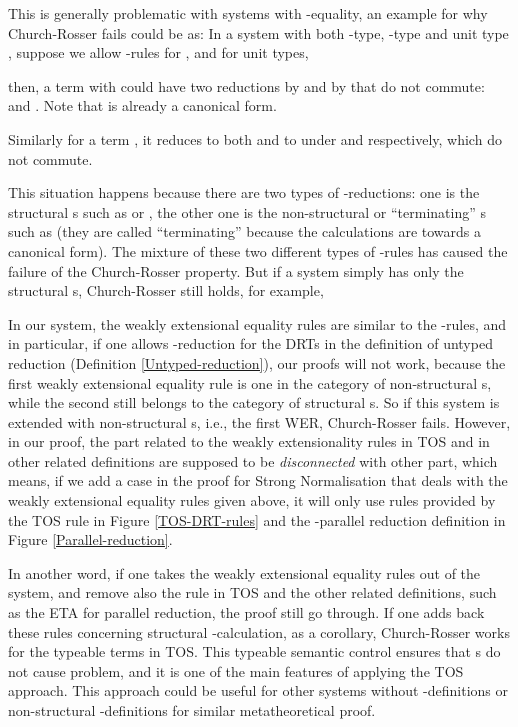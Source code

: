 \documentclass[submission,copyright,creativecommons]{eptcs}
\newcommand{\selfcomment}[1]{\ifodd 0 {\sf #1 }\fi}
\newcommand{\selfc}{\selfcomment}
\begin{document}
\selfc{

\par{
This is generally problematic with systems with -equality, an example for why Church-Rosser fails could be as: In a system with both -type, -type and unit type , suppose we allow -rules for ,  and for unit types, }


then, a term  with  could have two reductions by  and by  that do not commute:  and . Note that  is already a canonical form.
\par{Similarly for a term , it reduces to both  and to } under  and  respectively, which do not commute.

This situation happens because there are two types of -reductions: one is the structural s such as  or , the other one is the non-structural or ``terminating'' s such as  (they are called ``terminating'' because the calculations are towards a canonical form). The mixture of these two different types of -rules has caused the failure of the Church-Rosser property. But if a system simply has only the structural s, Church-Rosser still holds, for example,



\par{In our system, the weakly extensional equality rules are similar to the -rules, and in particular, if one allows -reduction for the DRTs in the definition of untyped reduction (Definition \ref{Untyped-reduction}), our proofs will not work, because the first weakly extensional equality rule is one in the category of non-structural s, while the second still belongs to the category of structural s. So if this system is extended with non-structural s, i.e., the first WER, Church-Rosser fails. However, in our proof, the part related to the weakly extensionality rules in TOS and in other related definitions are supposed to be \emph{disconnected} with other part, which means, if we add a case in the proof for Strong Normalisation that deals with the weakly extensional equality rules given above, it will only use rules provided by the TOS rule  in Figure \ref{TOS-DRT-rules} and the -parallel reduction definition in Figure \ref{Parallel-reduction}. }
\par{In another word, if one takes the weakly extensional equality rules out of the system, and remove also the  rule in TOS and the other related definitions, such as the ETA for parallel reduction, the proof still go through. If one adds back these rules concerning structural -calculation, as a corollary, Church-Rosser works for the typeable terms in TOS. This typeable semantic control ensures that s do not cause problem, and it is one of the main features of applying the TOS approach. This approach could be useful for other systems without -definitions or non-structural -definitions for similar metatheoretical proof. }







}
\end{document}
